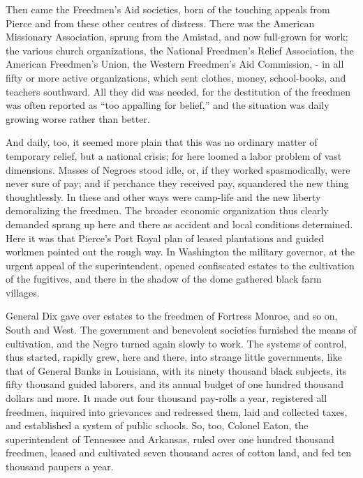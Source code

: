 Then came the Freedmen’s Aid societies, born of the touching appeals from Pierce and from these other centres of distress. There was the American Missionary Association, sprung from the Amistad, and now full-grown for work; the various church organizations, the National Freedmen’s Relief Association, the American Freedmen’s Union, the Western Freedmen’s Aid Commission, - in all fifty or more active organizations, which sent clothes, money, school-books, and teachers southward. All they did was needed, for the destitution of the freedmen was often reported as “too appalling for belief,” and the situation was daily growing worse rather than better.\par

And daily, too, it seemed more plain that this was no ordinary matter of temporary relief, but a national crisis; for here loomed a labor problem of vast dimensions. Masses of Negroes stood idle, or, if they worked spasmodically, were never sure of pay; and if perchance they received pay, squandered the new thing thoughtlessly. In these and other ways were camp-life and the new liberty demoralizing the freedmen. The broader economic organization thus clearly demanded sprang up here and there as accident and local conditions determined. Here it was that Pierce’s Port Royal plan of leased plantations and guided workmen pointed out the rough way. In Washington the military governor, at the urgent appeal of the superintendent, opened confiscated estates to the cultivation of the fugitives, and there in the shadow of the dome gathered black farm villages.\par

General Dix gave over estates to the freedmen of Fortress Monroe, and so on, South and West. The government and benevolent societies furnished the means of cultivation, and the Negro turned again slowly to work. The systems of control, thus started, rapidly grew, here and there, into strange little governments, like that of General Banks in Louisiana, with its ninety thousand black subjects, its fifty thousand guided laborers, and its annual budget of one hundred thousand dollars and more. It made out four thousand pay-rolls a year, registered all freedmen, inquired into grievances and redressed them, laid and collected taxes, and established a system of public schools. So, too, Colonel Eaton, the superintendent of Tennessee and Arkansas, ruled over one hundred thousand freedmen, leased and cultivated seven thousand acres of cotton land, and fed ten thousand paupers a year.\par

